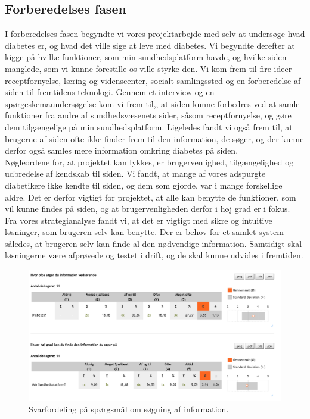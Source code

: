 \subsection{Forberedelses fasen}
I forberedelses fasen begyndte vi vores projektarbejde med selv at undersøge hvad diabetes er, og hvad det ville sige at leve med diabetes. Vi begyndte derefter at kigge på hvilke funktioner, som min sundhedsplatform havde, og hvilke siden manglede, som vi kunne forestille os ville styrke den. Vi kom frem til fire ideer - receptfornyelse, læring og videnscenter, socialt samlingssted og en forberedelse af siden til fremtidens teknologi. Gennem et interview og en spørgeskemaundersøgelse kom vi frem til,, at siden kunne forbedres ved at samle funktioner fra andre af sundhedsvæsenets sider, såsom receptfornyelse, og gøre dem tilgængelige på min sundhedsplatform. Ligeledes fandt vi også frem til, at brugerne af siden ofte ikke finder frem til den information, de søger, og der kunne derfor også samles mere information omkring diabetes på siden.\\
Nøgleordene for, at projektet kan lykkes, er brugervenlighed, tilgængelighed og udbredelse af kendskab til siden. Vi fandt, at mange af vores adspurgte diabetikere ikke kendte til siden, og dem som gjorde, var i mange forskellige aldre. Det er derfor vigtigt for projektet, at alle kan benytte de funktioner, som vil kunne findes på siden, og at brugervenligheden derfor i høj grad er i fokus.\\
Fra vores strategianalyse fandt vi, at det er vigtigt med sikre og intuitive løsninger, som brugeren selv kan benytte. Der er behov for et samlet system således, at brugeren selv kan finde al den nødvendige information. Samtidigt skal løsningerne være afprøvede og testet i drift, og de skal kunne udvides i fremtiden.
\begin{figure}[H]
	\centering
	\includegraphics[width=\textwidth]{Materials/SeekingInformation}
	\caption{Svarfordeling på spørgsmål om søgning af information.}
\end{figure}
